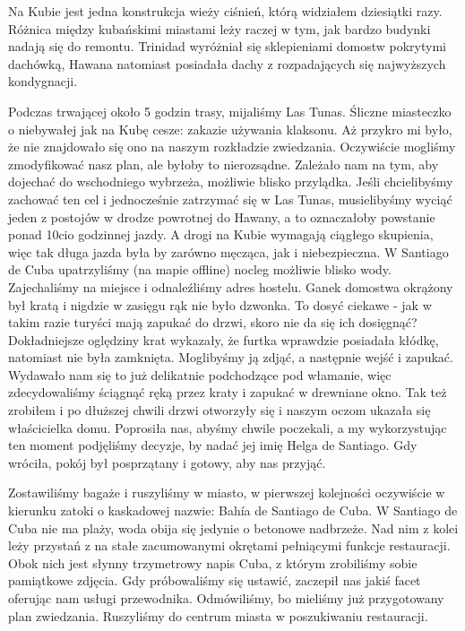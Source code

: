 Na Kubie jest jedna konstrukcja wieży ciśnień, którą widziałem dziesiątki razy.
Różnica między kubańskimi miastami leży raczej w tym, jak bardzo budynki nadają się do remontu.
Trinidad wyróżniał się sklepieniami domostw pokrytymi dachówką, 
Hawana natomiast posiadała dachy z rozpadających się najwyższych kondygnacji.
\par Podczas trwającej około 5 godzin trasy, mijaliśmy Las Tunas.
Śliczne miasteczko o niebywałej jak na Kubę cesze: zakazie używania klaksonu.
Aż przykro mi było, że nie znajdowało się ono na naszym rozkładzie zwiedzania.
Oczywiście mogliśmy zmodyfikować nasz plan, ale byłoby to nierozsądne.
Zależało nam na tym, aby dojechać do wschodniego wybrzeża, możliwie blisko przylądka.
Jeśli chcielibyśmy zachować ten cel i jednocześnie zatrzymać się w Las Tunas, musielibyśmy wyciąć jeden z postojów w drodze powrotnej do Hawany, a to oznaczałoby powstanie ponad 10cio godzinnej jazdy.
A drogi na Kubie wymagają ciągłego skupienia, więc tak długa jazda była by zarówno męcząca, jak i niebezpieczna.
W Santiago de Cuba upatrzyliśmy (na mapie offline) nocleg możliwie blisko wody.
Zajechaliśmy na miejsce i odnaleźliśmy adres hostelu.
Ganek domostwa okrążony był kratą i nigdzie w zasięgu rąk nie było dzwonka.
To dosyć ciekawe - jak w takim razie turyści mają zapukać do drzwi, skoro nie da się ich dosięgnąć?
Dokładniejsze oględziny krat wykazały, że furtka wprawdzie posiadała kłódkę, natomiast nie była zamknięta.
Moglibyśmy ją zdjąć, a następnie wejść i zapukać.
Wydawało nam się to już delikatnie podchodzące pod włamanie, więc zdecydowaliśmy ściągnąć ręką przez kraty i zapukać w drewniane okno.
Tak też zrobiłem i po dłuższej chwili drzwi otworzyły się i naszym oczom ukazała się właścicielka domu.
Poprosiła nas, abyśmy chwile poczekali, a my wykorzystując ten moment podjęliśmy decyzje, by nadać jej imię Helga de Santiago.
Gdy wróciła, pokój był posprzątany i gotowy, aby nas przyjąć.
\par Zostawiliśmy bagaże i ruszyliśmy w miasto, w pierwszej kolejności oczywiście w kierunku zatoki o kaskadowej nazwie: Bahía de Santiago de Cuba.
W Santiago de Cuba nie ma plaży, woda obija się jedynie o betonowe nadbrzeże.
Nad nim z kolei leży przystań z na stałe zacumowanymi okrętami pełniącymi funkcje restauracji.
Obok nich jest słynny trzymetrowy napis Cuba, z którym zrobiliśmy sobie pamiątkowe zdjęcia.
Gdy próbowaliśmy się ustawić, zaczepił nas jakiś facet oferując nam usługi przewodnika.
Odmówiliśmy, bo mieliśmy już przygotowany plan zwiedzania.
Ruszyliśmy do centrum miasta w poszukiwaniu restauracji.
